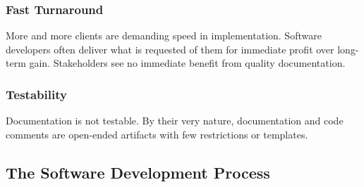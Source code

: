 \subsubsection*{Fast Turnaround}

More and more clients are demanding speed in implementation. Software developers
often deliver what is requested of them for immediate profit over long-term
gain. Stakeholders see no immediate benefit from quality documentation.

\subsubsection*{Testability}

Documentation is not testable. By their very nature, documentation and code
comments are open-ended artifacts with few restrictions or templates.

\subsection{The Software Development Process}
